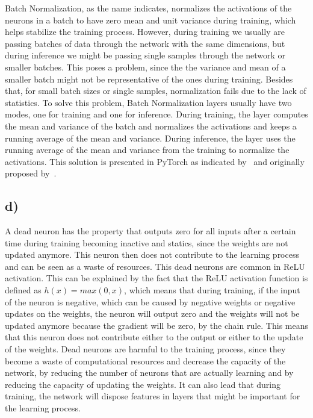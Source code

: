 \documentclass{article}
\begin{document}
Batch Normalization, as the name indicates, normalizes the activations of the neurons in a batch to have
zero mean and unit variance during training, which helps stabilize the training process. However, during training
we usually are passing batches of data through the network with the same dimensions, but during inference we might
be passing single samples through the network or smaller batches. This poses a problem, since the the variance and
mean of a smaller batch might not be representative of the ones during training. Besides that, for small batch sizes
or single samples, normalization fails due to the lack of statistics. To solve this problem, Batch Normalization
layers usually have two modes, one for training and one for inference. During training, the layer computes the mean
and variance of the batch and normalizes the activations and keeps a running average of the mean and variance. During
inference, the layer uses the running average of the mean and variance from the training to normalize the activations.
This solution is presented in PyTorch as indicated by~\citep{BatchNorm1d} and originally proposed by~\citep{Ioffe_Szegedy_2015}.

\subsection*{d)}

A dead neuron has the property that outputs zero for all inputs after a certain time during training
becoming inactive and statics, since the weights are not updated anymore. This neuron then does not contribute
to the learning process and can be seen as a waste of resources. This dead neurons are common in ReLU activation. 
This can be explained by the fact that the ReLU activation function is defined as $h(x) = max(0, x)$, which means that
during training, if the input of the neuron is negative, which can be caused by negative weights or
negative updates on the weights, the neuron will output zero and the weights will not be updated anymore because
the gradient will be zero, by the chain rule. This means that this neuron does not contribute either to the output
or either to the update of the weights.
Dead neurons are harmful to the training process, since they become a waste of computational resources and decrease
the capacity of the network, by reducing the number of neurons that are actually learning and by reducing the capacity
of updating the weights. It can also lead that during training, the network will dispose features in layers
that might be important for the learning process.
\end{document}
